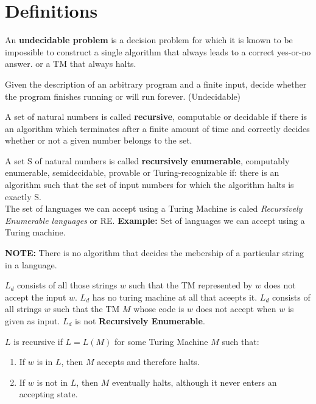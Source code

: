 \documentclass[a4paper,oneside]{book}
\begin{document}
\section{Definitions}
\begin{definition}
An \textbf{undecidable problem} is a decision problem for which it is known to be impossible to construct a single algorithm that always leads to a correct yes-or-no answer. or a TM that always halts.
\end{definition}
\begin{definition}
Given the description of an arbitrary program and a finite input, decide whether the program finishes running or will run forever. (Undecidable)
\end{definition}
\begin{definition}
A set of natural numbers is called \textbf{recursive}, computable or decidable if there is an algorithm which terminates after a finite amount of time and correctly decides whether or not a given number belongs to the set.
\end{definition}
\begin{definition}
A set S of natural numbers is called \textbf{recursively enumerable}, computably enumerable, semidecidable, provable or Turing-recognizable if:
there is an algorithm such that the set of input numbers for which the algorithm halts is exactly S.\\
The set of languages we can accept using a Turing Machine is caled \textit{Recursively Enumerable languages} or RE.
\textbf{Example:}  Set of languages we can accept using a Turing machine.
\end{definition}
\textbf{NOTE:} There is no algorithm that decides the mebership of a particular string in a language.
\begin{definition}
	$L_d$ consists of all those strings $w$ such that the TM represented by $w$ does not accept the input $w$. $L_d$ has no turing machine at all that aceepts it. $L_d$ consists of all strings $w$ such that the TM $M$ whose code is $w$ does not accept when $w$ is given as input. $L_d$ is not \textbf{Recursively Enumerable}.
\end{definition}
\begin{definition}
$L$ is recursive if $L = L(M)$ for some Turing Machine $M$ such that:
\begin{enumerate}
	\item If $w$ is in $L$, then $M$ accepts and therefore halts.
	\item If $w$ is not in $L$, then $M$ eventually halts, although it never enters an accepting state.
\end{enumerate}
\end{definition}
\end{document}
